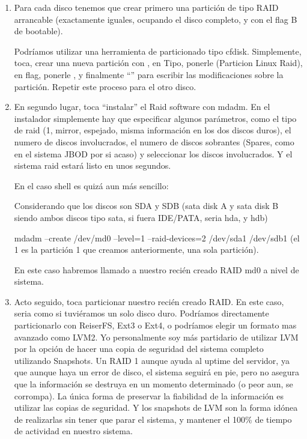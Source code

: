 \begin{enumerate}
	  \setlength{\itemsep}{10pt}

	\item Para cada disco tenemos que crear primero una partición de tipo RAID arrancable (exactamente iguales, ocupando el disco completo, y con el flag B de bootable).

Podríamos utilizar una herramienta de particionado tipo cfdisk. Simplemente, toca, crear una nueva partición con , en Tipo, ponerle  (Particion Linux Raid), en flag, ponerle , y finalmente “” para escribir las modificaciones sobre la partición. Repetir este proceso para el otro disco. 

	\item En segundo lugar, toca “instalar” el Raid software con mdadm. En el instalador simplemente hay que especificar algunos parámetros, como el tipo de raid (1, mirror, espejado, misma información en los dos discos duros), el numero de discos involucrados, el numero de discos sobrantes (Spares, como en el sistema JBOD por si acaso) y seleccionar los discos involucrados. Y el sistema raid estará listo en unos segundos.

En el caso shell es quizá aun más sencillo:

Considerando que los discos son SDA y SDB (sata disk A y sata disk B siendo ambos discos tipo sata, si fuera IDE/PATA, seria hda, y hdb)

mdadm –create /dev/md0 –level=1 –raid-devices=2 /dev/sda1 /dev/sdb1 (el 1 es la partición 1 que creamos anteriormente, una sola partición).

En este caso habremos llamado a nuestro recién creado RAID md0 a nivel de sistema.

	\item Acto seguido, toca particionar nuestro recién creado RAID. En este caso, seria como si tuviéramos un solo disco duro. Podríamos directamente particionarlo con ReiserFS, Ext3 o Ext4, o podríamos elegir un formato mas avanzado como LVM2. Yo personalmente soy más partidario de utilizar LVM por la opción de hacer una copia de seguridad del sistema completo utilizando Snapshots. Un RAID 1 aunque ayuda al uptime del servidor, ya que aunque haya un error de disco, el sistema seguirá en pie, pero no asegura que la información se destruya en un momento determinado (o peor aun, se corrompa). La única forma de preservar la fiabilidad de la información es utilizar las copias de seguridad. Y los snapshots de LVM son la forma idónea de realizarlas sin tener que parar el sistema, y mantener el 100\% de tiempo de actividad en nuestro sistema.


\end{enumerate}
